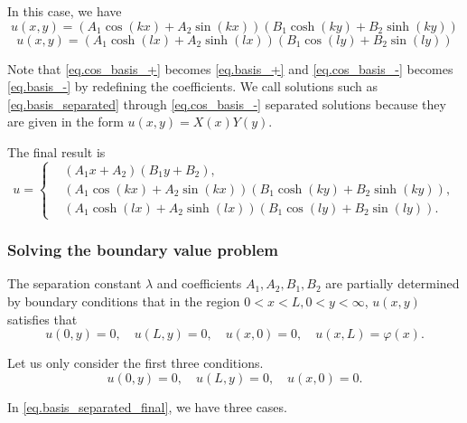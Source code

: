 In this case, we have
\begin{equation}\label{eq.cos_basis_+}
    u(x, y)=\left(A_1 \cos (k x)+A_2 \sin (k x)\right)\left(B_1 \cosh (k y)+B_2 \sinh (k y)\right)
\end{equation}
\begin{equation}\label{eq.cos_basis_-}
    u(x, y)=\left(A_1 \cosh (l x)+A_2 \sinh (l x)\right)\left(B_1 \cos (l y)+B_2 \sin (l y)\right)
\end{equation}

Note that \eqref{eq.cos_basis_+} becomes \eqref{eq.basis_+} and \eqref{eq.cos_basis_-} becomes \eqref{eq.basis_-} by redefining the coefficients. We call solutions such as \eqref{eq.basis_separated} through \eqref{eq.cos_basis_-} separated solutions because they are given in the form $u(x, y)=X(x) Y(y)$.

The final result is 
\begin{equation}\label{eq.basis_separated_final}
u=
\left\{\begin{aligned}
&\left(A_1 x+A_2\right)\left(B_1 y+B_2\right), 
\\
&\left(A_1 \cos (k x)+A_2 \sin (k x)\right)\left(B_1 \cosh (k y)+B_2 \sinh (k y)\right),
\\
&\left(A_1 \cosh (l x)+A_2 \sinh (l x)\right)\left(B_1 \cos (l y)+B_2 \sin (l y)\right).
\end{aligned}\right.
\end{equation}

\subsubsection{Solving the boundary value problem}
The separation constant $\lambda$ and coefficients $A_1, A_2, B_1, B_2$ are partially determined by boundary conditions that in the region $0<x<L, 0<y<\infty$, $u(x, y)$ satisfies that
\begin{equation}\label{eq.solve_boundary_value_1}
u(0, y)=0, \quad u(L, y)=0, \quad u(x, 0)=0, \quad u(x, L)=\varphi(x).
\end{equation}

Let us only consider the first three conditions.
\begin{equation}\label{eq.solve_boundary_value_2}
u(0, y)=0, \quad u(L, y)=0, \quad u(x, 0)=0.
\end{equation}

In \eqref{eq.basis_separated_final}, we have three cases.

